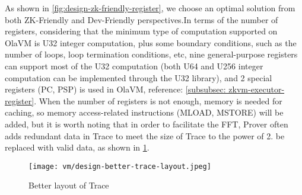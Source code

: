 As shown in \ref{fig:design-zk-friendly-register}, we choose an optimal solution from both ZK-Friendly and Dev-Friendly perspectives.In terms of the number of
registers, considering that the minimum type of computation supported on OlaVM is U32 integer computation, plus some boundary conditions,
such as the number of loops, loop termination conditions, etc, nine general-purpose registers can support most of the U32 computation
(both U64 and U256 integer computation can be implemented through the U32 library), and 2 special registers (PC, PSP) is used in OlaVM, reference: \ref{subsubsec: zkvm-executor-register}.
When the number of registers is not enough, memory is needed for caching, so memory access-related instructions
(MLOAD, MSTORE) will be added, but it is worth noting that in order to facilitate the FFT, Prover often adds redundant data in Trace to meet
the size of Trace to the power of 2. be replaced with valid data, as shown in \ref{fig:design-better-trace-layout}.

\begin{figure}[!ht]
    \centering
    \texttt{[image: vm/design-better-trace-layout.jpeg]}
    \caption{Better layout of Trace}
    \label{fig:design-better-trace-layout}
\end{figure}
